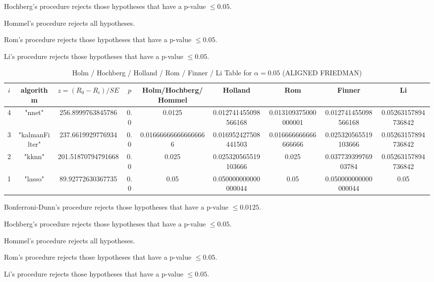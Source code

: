 \documentclass[a4paper,10pt]{article}
\begin{document}
\begin{landscape}
Hochberg's procedure rejects those hypotheses that have a p-value $\le0.05$.


Hommel's procedure rejects all hypotheses.


Rom's procedure rejects those hypotheses that have a p-value $\le0.05$.


Li's procedure rejects those hypotheses that have a p-value $\le0.05$.



\newpage

\begin{table}[!htp]
\centering\scriptsize
\caption{Holm / Hochberg / Holland / Rom / Finner / Li Table for $\alpha=0.05$ (ALIGNED FRIEDMAN)}
\begin{tabular}{ccccccccc}
$i$&algorithm&$z=(R_0 - R_i)/SE$&$p$&Holm/Hochberg/Hommel&Holland&Rom&Finner&Li\\
\hline
4&"nnet"&256.8999763845786&0.0&0.0125&0.012741455098566168&0.013109375000000001&0.012741455098566168&0.05263157894736842\\
3&"kalmanFilter"&237.6619929776934&0.0&0.016666666666666666&0.016952427508441503&0.016666666666666666&0.025320565519103666&0.05263157894736842\\
2&"kknn"&201.51870794791668&0.0&0.025&0.025320565519103666&0.025&0.03773939976903784&0.05263157894736842\\
1&"lasso"&89.92772630367735&0.0&0.05&0.050000000000000044&0.05&0.050000000000000044&0.05\\
\hline
\end{tabular}
\end{table}
Bonferroni-Dunn's procedure rejects those hypotheses that have a p-value $\le0.0125$.


Hochberg's procedure rejects those hypotheses that have a p-value $\le0.05$.


Hommel's procedure rejects all hypotheses.


Rom's procedure rejects those hypotheses that have a p-value $\le0.05$.


Li's procedure rejects those hypotheses that have a p-value $\le0.05$.



\newpage


\end{landscape}
\end{document}

